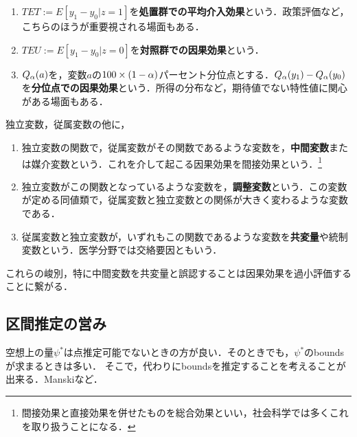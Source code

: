 \documentclass[uplatex,dvipdfmx]{jsreport}
\begin{document}
\begin{definition}\mbox{}
    \begin{enumerate}
        \item $TET:=E[y_1-y_0|z=1]$を\textbf{処置群での平均介入効果}という．政策評価など，こちらのほうが重要視される場面もある．
        \item $TEU:=E[y_1-y_0|z=0]$を\textbf{対照群での因果効果}という．
        \item $Q_\alpha(a)$を，変数$a$の$100\times(1-\alpha)$パーセント分位点とする．$Q_\alpha(y_1)-Q_\alpha(y_0)$を\textbf{分位点での因果効果}という．所得の分布など，期待値でない特性値に関心がある場面もある．
    \end{enumerate}
\end{definition}

\begin{definition}
    独立変数，従属変数の他に，
    \begin{enumerate}
        \item 独立変数の関数で，従属変数がその関数であるような変数を，\textbf{中間変数}または媒介変数という．これを介して起こる因果効果を間接効果という．\footnote{間接効果と直接効果を併せたものを総合効果といい，社会科学では多くこれを取り扱うことになる．}
        \item 独立変数がこの関数となっているような変数を，\textbf{調整変数}という．この変数が定める同値類で，従属変数と独立変数との関係が大きく変わるような変数である．
        \item 従属変数と独立変数が，いずれもこの関数であるような変数を\textbf{共変量}や統制変数という．医学分野では交絡要因ともいう．
    \end{enumerate}
\end{definition}
\begin{remark}
    これらの峻別，特に中間変数を共変量と誤認することは因果効果を過小評価することに繋がる．
\end{remark}

\subsection{区間推定の営み}

\begin{tcolorbox}[colframe=ForestGreen, colback=ForestGreen!10!white,breakable,colbacktitle=ForestGreen!40!white,coltitle=black,fonttitle=\bfseries\sffamily,
title=]
    空想上の量$\psi^*$は点推定可能でないときの方が良い．そのときでも，$\psi^*$のboundsが求まるときは多い．
    そこで，代わりにboundsを推定することを考えることが出来る．Manskiなど．
\end{tcolorbox}
\end{document}
